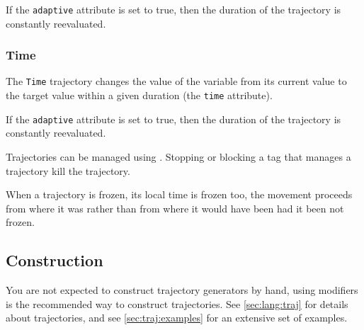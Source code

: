 
If the \lstinline{adaptive} attribute is set to true, then the
duration of the trajectory is constantly reevaluated.


\subsubsection{Time}

The \lstinline{Time} trajectory changes the value of the variable from
its current value to the target value within a given duration (the
\lstinline{time} attribute).


If the \lstinline{adaptive} attribute is set to true, then the
duration of the trajectory is constantly reevaluated.


\let\subsubsection\subsubsectionOrig

\subsubsection{Trajectories and Tags}

Trajectories can be managed using .  Stopping or blocking
a tag that manages a trajectory kill the trajectory.


When a trajectory is frozen, its local time is frozen too, the movement
proceeds from where it was rather than from where it would have been had it
been not frozen.



\subsection{Construction}

You are not expected to construct trajectory generators by hand, using
modifiers is the recommended way to construct trajectories.  See
\autoref{sec:lang:traj} for details about trajectories, and see
\autoref{sec:traj:examples} for an extensive set of examples.


